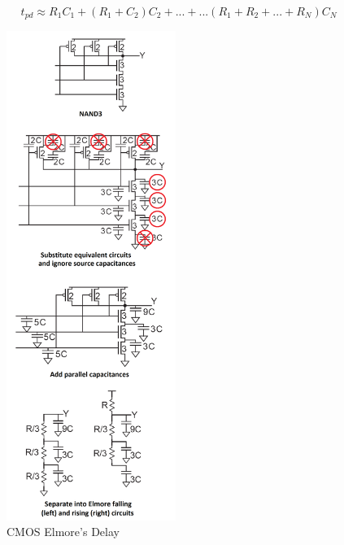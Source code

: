 \documentclass{article}
\begin{document}
\begin{equation}
t_{pd} \approx R_1 C_1 + (R_1+C_2) C_2 + ... + ... (R_1+R_2+...+R_N)C_N
\end{equation}

\begin{minipage}{0.5\textwidth}
\begin{figure}[H]
\includegraphics[width=55mm]{elmore.png}
\caption{CMOS Elmore's Delay}
\end{figure}
\end{minipage} \hfill
\end{document}
